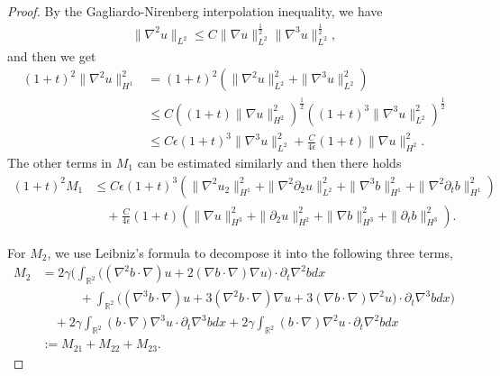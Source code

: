 \documentclass[reqno,11pt]{amsart}
\def\R{\mathbb R}
\numberwithin{Thm}{section}
\begin{document}
\begin{proof}
By the Gagliardo-Nirenberg interpolation inequality, we have
\begin{align*}
\|\nabla^2 u\|_{L^2}\leq C\| \nabla u\|_{L^2}^{\frac{1}{2}}\|\nabla^{3}u\|_{L^2}^{\frac{1}{2}},
\end{align*}
and then we get
\begin{align*}
(1+t)^2\|\nabla^2 u\|^2_{H^1}
&=(1+t)^2(\|\nabla^2 u\|^2_{L^2}+\|\nabla^3 u\|^2_{L^2})\nonumber\\
&\leq C\left((1+t)\|\nabla u\|_{H^2}^2\right)^{\frac{1}{2}}\left((1+t)^3\|\nabla^3 u\|_{L^2}^2\right)^{\frac{1}{2}}\nonumber\\&\leq C\epsilon(1+t)^3\|\nabla^3 u\|_{L^2}^2+\frac{C}{4\epsilon}(1+t)\|\nabla u\|_{H^2}^2.
\end{align*}
The other terms in $M_{1}$ can be estimated similarly and then there holds
\begin{align}\label{m1-0}
(1+t)^2M_{1}
&\leq C\epsilon(1+t)^3(\|\nabla^2 u_2\|_{H^1}^2+\|\nabla^2\partial_2 u\|_{L^2}^2+\|\nabla^3 b\|_{H^1}^2+\|\nabla^2\partial_t b\|_{H^1}^2)\nonumber\\&\quad+\frac{C}{4\epsilon}(1+t)(\|\nabla u\|_{H^3}^2+\|\partial_2 u\|_{H^2}^2+\|\nabla b\|_{H^3}^2+\|\partial_t b\|_{H^3}^2).
\end{align}


For $M_{2}$, we use Leibniz's formula to decompose it into the following three terms,
\begin{align}\label{GKKK}
M_2
&=2\gamma\Big(\int_{\R^2}\big((\nabla^2b\cdot\nabla) u+2(\nabla b\cdot\nabla)\nabla u\big)\cdot\partial_t\nabla^2 bdx\nonumber\\
&\quad\quad\quad+\int_{\R^2}\big((\nabla^3b\cdot\nabla) u+3(\nabla^2b\cdot\nabla)\nabla u+3(\nabla b\cdot \nabla)\nabla^2 u\big)\cdot\partial_t\nabla^3 bdx\Big)\nonumber\\
&\quad+2\gamma\int_{\R^2}(b\cdot\nabla) \nabla^3 u\cdot\partial_t\nabla^3 bdx+2\gamma\int_{\R^2}(b\cdot\nabla) \nabla^2 u\cdot\partial_t\nabla^2 bdx\nonumber\\
&:= M_{21}+M_{22}+M_{23}.
\end{align}


\end{proof}
\end{document}
